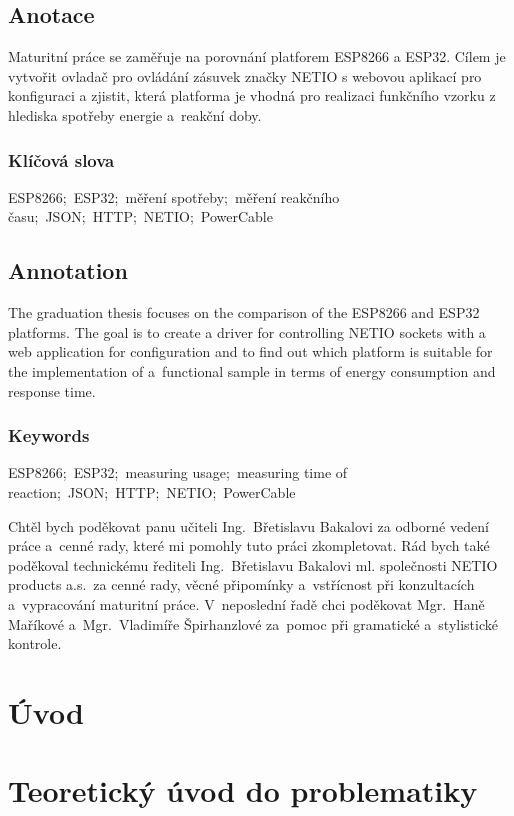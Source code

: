 \documentclass[a4paper, 12pt]{report}
\begin{document}
    \nocite{*}


    \titulniStrana
    \section*{Anotace}
    Maturitní práce se zaměřuje na porovnání platforem ESP8266 a ESP32.
    Cílem je vytvořit ovladač pro ovládání zásuvek značky NETIO s webovou aplikací pro konfiguraci a zjistit, která platforma je vhodná pro realizaci funkčního vzorku z hlediska spotřeby energie a~reakční doby.
    \subsection*{Klíčová slova}
    ESP8266;\ ESP32;\ měření spotřeby;\ měření reakčního času;\ JSON;\ HTTP;\ NETIO;\ PowerCable

    \section*{Annotation}
    The graduation thesis focuses on the comparison of the ESP8266 and ESP32 platforms. The goal is to create a driver for controlling NETIO sockets with a web application for configuration and to find out which platform is suitable for the implementation of a~functional sample in terms of energy consumption and response time.
    \subsection*{Keywords}
    ESP8266;\ ESP32;\ measuring usage;\ measuring time of reaction;\ JSON;\ HTTP;\ NETIO;\ PowerCable

    \podekovani
    Chtěl bych poděkovat panu učiteli Ing.~Břetislavu Bakalovi za odborné vedení práce a~cenné rady, které mi pomohly tuto práci zkompletovat.
    Rád bych také poděkoval technickému řediteli Ing.~Břetislavu Bakalovi ml.
    společnosti NETIO products a.s.\ za cenné rady, věcné připomínky a~vstřícnost při konzultacích a~vypracování maturitní práce.
    V~neposlední řadě chci poděkovat Mgr.~Haně Maříkové a~Mgr.~Vladimíře Špirhanzlové za~pomoc při gramatické a~stylistické kontrole.
    \tableofcontents


    \chapter{Úvod}\label{ch:uvod}


    \chapter{Teoretický úvod do problematiky}\label{ch:teorie}
\end{document}
